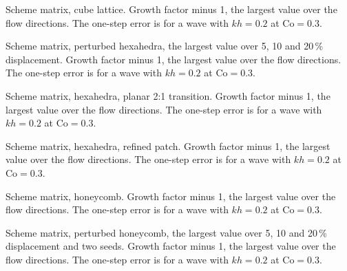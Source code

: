 \documentclass[11pt,a4paper]{article}
\newcommand{\tables}{data/tables}
\begin{document}
\begin{table}[p]
\centering\setlength{\tabcolsep}{4pt}
\resizebox{\linewidth}{!}{}
\caption{Scheme matrix, cube lattice. Growth factor minus 1, the largest value over the flow
directions. The one-step error is for a wave with $kh = 0.2$ at $\mathrm{Co} = 0.3$.}
\label{tab:sm-cube}
\end{table}

\begin{table}[p]
\centering\setlength{\tabcolsep}{4pt}
\resizebox{\linewidth}{!}{}
\caption{Scheme matrix, perturbed hexahedra, the largest value over 5, 10 and 20\,\% displacement. Growth factor minus 1, the largest value over the flow
directions. The one-step error is for a wave with $kh = 0.2$ at $\mathrm{Co} = 0.3$.}
\label{tab:sm-hexPert}
\end{table}

\begin{table}[p]
\centering\setlength{\tabcolsep}{4pt}
\resizebox{\linewidth}{!}{}
\caption{Scheme matrix, hexahedra, planar 2:1 transition. Growth factor minus 1, the largest value over the flow
directions. The one-step error is for a wave with $kh = 0.2$ at $\mathrm{Co} = 0.3$.}
\label{tab:sm-hex21}
\end{table}

\begin{table}[p]
\centering\setlength{\tabcolsep}{4pt}
\resizebox{\linewidth}{!}{}
\caption{Scheme matrix, hexahedra, refined patch. Growth factor minus 1, the largest value over the flow
directions. The one-step error is for a wave with $kh = 0.2$ at $\mathrm{Co} = 0.3$.}
\label{tab:sm-hex21patch}
\end{table}

\begin{table}[p]
\centering\setlength{\tabcolsep}{4pt}
\resizebox{\linewidth}{!}{}
\caption{Scheme matrix, honeycomb. Growth factor minus 1, the largest value over the flow
directions. The one-step error is for a wave with $kh = 0.2$ at $\mathrm{Co} = 0.3$.}
\label{tab:sm-honeycomb}
\end{table}

\begin{table}[p]
\centering\setlength{\tabcolsep}{4pt}
\resizebox{\linewidth}{!}{}
\caption{Scheme matrix, perturbed honeycomb, the largest value over 5, 10 and 20\,\% displacement and two seeds. Growth factor minus 1, the largest value over the flow
directions. The one-step error is for a wave with $kh = 0.2$ at $\mathrm{Co} = 0.3$.}
\label{tab:sm-honeycombPert}
\end{table}
\end{document}
